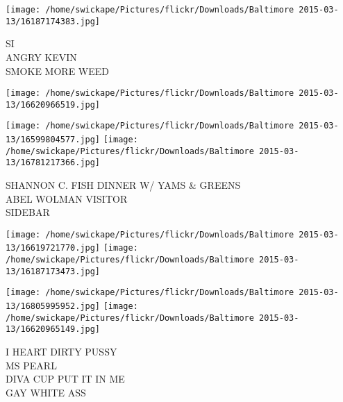 \documentclass[10pt,letterpaper]{article}
\begin{document}
\texttt{[image: /home/swickape/Pictures/flickr/Downloads/Baltimore 2015-03-13/16187174383.jpg]}

SI\\
ANGRY KEVIN\\
SMOKE MORE WEED\\
\pagebreak

\texttt{[image: /home/swickape/Pictures/flickr/Downloads/Baltimore 2015-03-13/16620966519.jpg]}

\vspace{0.25in}
\texttt{[image: /home/swickape/Pictures/flickr/Downloads/Baltimore 2015-03-13/16599804577.jpg]}
\texttt{[image: /home/swickape/Pictures/flickr/Downloads/Baltimore 2015-03-13/16781217366.jpg]}

SHANNON C. FISH DINNER W/ YAMS \& GREENS\\
ABEL WOLMAN VISITOR\\
SIDEBAR\\
\pagebreak

\texttt{[image: /home/swickape/Pictures/flickr/Downloads/Baltimore 2015-03-13/16619721770.jpg]}
\texttt{[image: /home/swickape/Pictures/flickr/Downloads/Baltimore 2015-03-13/16187173473.jpg]}

\texttt{[image: /home/swickape/Pictures/flickr/Downloads/Baltimore 2015-03-13/16805995952.jpg]}
\texttt{[image: /home/swickape/Pictures/flickr/Downloads/Baltimore 2015-03-13/16620965149.jpg]}

I HEART DIRTY PUSSY\\
MS PEARL\\
DIVA CUP PUT IT IN ME\\
GAY WHITE ASS\\
\pagebreak
\end{document}
